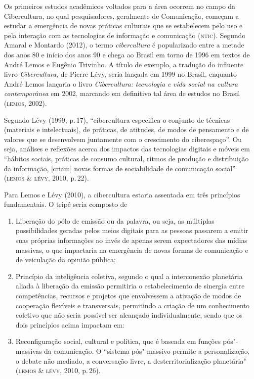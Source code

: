 {Os primeiros estudos acadêmicos voltados para a área ocorrem no campo da
Cibercultura, no qual pesquisadores, geralmente de Comunicação,
começam a estudar a emergência de novas práticas culturais que se
estabelecem pelo uso e pela interação com as tecnologias de informação e
comunicação (\textsc{ntic}). Segundo Amaral e Montardo (2012), o termo
\textit{cibercultura} é popularizado entre a metade dos anos 80 e início dos anos
90 e chega ao Brasil em torno de 1996 em textos de André Lemos e Eugênio
Trivinho. A título de exemplo, a tradução do influente livro
\textit{Cibercultura}, de Pierre Lévy, seria lançada em 1999 no Brasil,
enquanto André Lemos lançaria o livro \textit{Cibercultura: tecnologia e
vida social na cultura contemporânea} em 2002, marcando em definitivo
tal área de estudos no Brasil (\textsc{lemos}, 2002).

Segundo Lévy (1999, p.\,17), ``cibercultura especifica o conjunto de
técnicas (materiais e intelectuais), de práticas, de atitudes, de modos
de pensamento e de valores que se desenvolvem juntamente com o
crescimento do ciberespaço''. Ou seja, análises e reflexões acerca dos
impactos das tecnologias digitais e móveis em ``hábitos sociais,
práticas de consumo cultural, ritmos de produção e distribuição da
informação, {[}criam{]} novas formas de sociabilidade de comunicação
social'' (\textsc{lemos \& lévy}, 2010, p.\,22).

Para Lemos e Lévy (2010), a cibercultura estaria assentada em três
princípios fundamentais. O tripé seria composto de 

\begin{enumerate}
\item Liberação do pólo de emissão ou da palavra, ou seja, as múltiplas possibilidades geradas pelos meios digitais para as pessoas passarem a emitir suas próprias informações ao invés de apenas serem expectadores das mídias massivas, o que impactaria na emergência de novas formas de comunicação e de veiculação da opinião pública;

\item Princípio da inteligência coletiva, segundo o qual a interconexão planetária aliada à liberação da emissão permitiria o estabelecimento de sinergia entre competências, recursos e projetos que envolvessem a ativação de modos de cooperação flexíveis e transversais, permitindo a criação de um conhecimento coletivo que não seria possível ser alcançado individualmente; sendo que os dois princípios acima impactam em:

\item Reconfiguração social, cultural e política, que é baseada em funções pós"-massivas da comunicação. O ``sistema pós"-massivo permite a personalização, o debate não mediado, a conversação livre, a desterritorialização planetária'' (\textsc{lemos \& lévy}, 2010, p.\,26). 
\end{enumerate}

}
